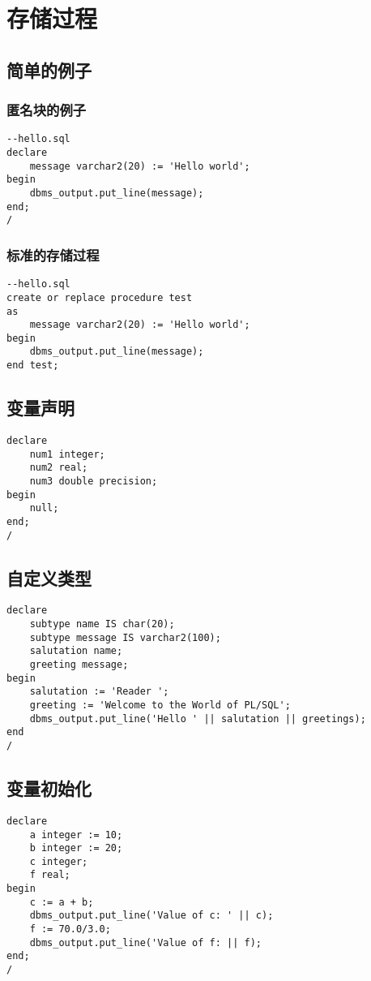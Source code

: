 \documentclass{article}
\begin{document}
\section{存储过程}
\subsection{简单的例子}
\subsubsection{匿名块的例子}
\begin{verbatim}
--hello.sql
declare 
	message varchar2(20) := 'Hello world';
begin
	dbms_output.put_line(message);
end;
/
\end{verbatim}
\subsubsection{标准的存储过程}
\begin{verbatim}
--hello.sql
create or replace procedure test
as
	message varchar2(20) := 'Hello world';
begin
	dbms_output.put_line(message);
end test;
\end{verbatim}

\subsection{变量声明}
\begin{verbatim}
declare
	num1 integer;
	num2 real;
	num3 double precision;
begin
	null;
end;
/
\end{verbatim}

\subsection{自定义类型}
\begin{verbatim}
declare 
	subtype name IS char(20); 
	subtype message IS varchar2(100);
	salutation name;
	greeting message;
begin
	salutation := 'Reader ';
	greeting := 'Welcome to the World of PL/SQL';
	dbms_output.put_line('Hello ' || salutation || greetings);
end
/
\end{verbatim}

\subsection{变量初始化}
\begin{verbatim}
declare
	a integer := 10;
	b integer := 20;
	c integer;
	f real;
begin
	c := a + b;
	dbms_output.put_line('Value of c: ' || c);
	f := 70.0/3.0;
	dbms_output.put_line('Value of f: || f);
end;
/
\end{verbatim}
\end{document}
